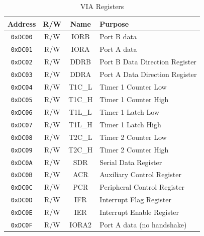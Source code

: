 \begin{table}[ht]
    \begin{center}
        \begin{tabular}{|c|c|c|l|} \hline
            Address & R/W & Name & Purpose \\\hline\hline
            \verb+0xDC00+ & R/W & IORB & Port B data \\\hline
            \verb+0xDC01+ & R/W & IORA & Port A data \\\hline
            \verb+0xDC02+ & R/W & DDRB & Port B Data Direction Register \\\hline
            \verb+0xDC03+ & R/W & DDRA & Port A Data Direction Register \\\hline
            \verb+0xDC04+ & R/W & T1C\_L & Timer 1 Counter Low \\\hline
            \verb+0xDC05+ & R/W & T1C\_H & Timer 1 Counter High \\\hline
            \verb+0xDC06+ & R/W & T1L\_L & Timer 1 Latch Low \\\hline
            \verb+0xDC07+ & R/W & T1L\_H & Timer 1 Latch High \\\hline
            \verb+0xDC08+ & R/W & T2C\_L & Timer 2 Counter Low \\\hline
            \verb+0xDC09+ & R/W & T2C\_H & Timer 2 Counter High \\\hline
            \verb+0xDC0A+ & R/W & SDR & Serial Data Register \\\hline
            \verb+0xDC0B+ & R/W & ACR & Auxiliary Control Register \\\hline
            \verb+0xDC0C+ & R/W & PCR & Peripheral Control Register \\\hline
            \verb+0xDC0D+ & R/W & IFR & Interrupt Flag Register \\\hline
            \verb+0xDC0E+ & R/W & IER & Interrupt Enable Register \\\hline
            \verb+0xDC0F+ & R/W & IORA2 & Port A data (no handshake) \\\hline
        \end{tabular}
    \end{center}
    \caption{VIA Registers}
    \label{tab:via_reg}
\end{table}

